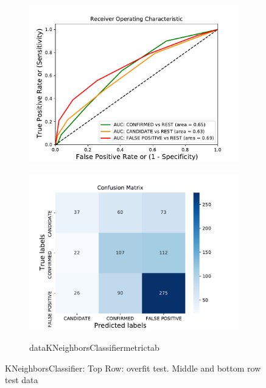 \begin{figure}[H]
\begin{subfigure}{.49\textwidth}
                \includegraphics[width = 1\textwidth]{data/KNeighborsClassifier_roc.pdf}
                \end{subfigure}
                \begin{subfigure}{.49\textwidth}
                \includegraphics[width = 1\textwidth]{data/KNeighborsClassifier_cm.pdf}
                \end{subfigure}
                \begin{subfigure}{1\textwidth}
                \csname dataKNeighborsClassifiermetrictab\endcsname
                \end{subfigure}
                \caption{KNeighborsClassifier: Top Row: overfit test. Middle and bottom row test data}
                \label{fig:data/KNeighborsClassifier_roc}
                \end{figure}